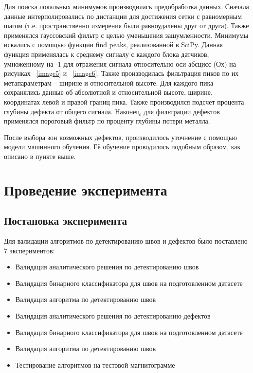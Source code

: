 \documentclass[a4paper,article,14pt]{extarticle}
\begin{document}
Для поиска локальных минимумов производилась предобработка данных. Сначала данные интерполировались по 
дистанции для достижения сетки с равномерным шагом (т.е. пространственно измерения были равноудалены друг от друга). 
Также применялся гауссовский фильтр с целью уменьшения зашумленности. Минимумы искались с помощью функции find peaks, 
реализованной в SciPy. Данная функция применялась к среднему сигналу с каждого блока датчиков, умноженному на -1 
для отражения сигнала относительно оси абсцисс (Ох) на рисунках  ~\ref{image5} и ~\ref{image6}. Также производилась фильтрация пиков по их 
метапараметрам – ширине и относительной высоте. Для каждого пика сохранялись данные об абсолютной и относительной 
высоте, ширине, координатах левой и правой границ пика. Также производился подсчет процента глубины дефекта от общего 
сигнала. Наконец, для фильтрации дефектов применялся пороговый фильтр по проценту глубины потери металла.

После выбора зон возможных дефектов, производилось уточнение с помощью модели машинного обучения. Её обучение 
проводилось подобным образом, как описано в пункте выше.




\pagebreak
\section{Проведение эксперимента}

\subsection{Постановка эксперимента}

Для валидации алгоритмов по детектированию швов и дефектов было поставлено 7 экспериментов:
\begin{itemize}
    \item Валидация аналитического решения по детектированию швов
    \item Валидация бинарного классификатора для швов на подготовленном датасете
    \item Валидация алгоритма по детектированию швов
    \item Валидация аналитического решения по детектированию дефектов
    \item Валидация бинарного классификатора для швов на подготовленном датасете
    \item Валидация алгоритма по детектированию швов
    \item Тестирование алгоритмов на тестовой магнитограмме
\end{itemize}
\end{document}

